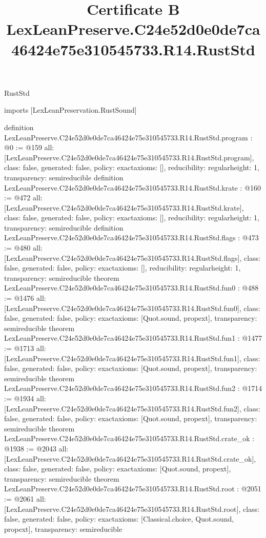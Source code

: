 \begin{lexlean}{RustStd}
\title{Certificate B LexLeanPreserve.C24e52d0e0de7ca46424e75e310545733.R14.RustStd}
\begin{coremodule}
imports [LexLeanPreservation.RustSound]

definition LexLeanPreserve.C24e52d0e0de7ca46424e75e310545733.R14.RustStd.program : @0 := @159 {
  all: [LexLeanPreserve.C24e52d0e0de7ca46424e75e310545733.R14.RustStd.program],
  class: false,
  generated: false,
  policy: exact{axioms: []},
  reducibility: regular{height: 1},
  transparency: semireducible
}
definition LexLeanPreserve.C24e52d0e0de7ca46424e75e310545733.R14.RustStd.krate : @160 := @472 {
  all: [LexLeanPreserve.C24e52d0e0de7ca46424e75e310545733.R14.RustStd.krate],
  class: false,
  generated: false,
  policy: exact{axioms: []},
  reducibility: regular{height: 1},
  transparency: semireducible
}
definition LexLeanPreserve.C24e52d0e0de7ca46424e75e310545733.R14.RustStd.flags : @473 := @480 {
  all: [LexLeanPreserve.C24e52d0e0de7ca46424e75e310545733.R14.RustStd.flags],
  class: false,
  generated: false,
  policy: exact{axioms: []},
  reducibility: regular{height: 1},
  transparency: semireducible
}
theorem LexLeanPreserve.C24e52d0e0de7ca46424e75e310545733.R14.RustStd.fun0 : @488 := @1476 {
  all: [LexLeanPreserve.C24e52d0e0de7ca46424e75e310545733.R14.RustStd.fun0],
  class: false,
  generated: false,
  policy: exact{axioms: [Quot.sound, propext]},
  transparency: semireducible
}
theorem LexLeanPreserve.C24e52d0e0de7ca46424e75e310545733.R14.RustStd.fun1 : @1477 := @1713 {
  all: [LexLeanPreserve.C24e52d0e0de7ca46424e75e310545733.R14.RustStd.fun1],
  class: false,
  generated: false,
  policy: exact{axioms: [Quot.sound, propext]},
  transparency: semireducible
}
theorem LexLeanPreserve.C24e52d0e0de7ca46424e75e310545733.R14.RustStd.fun2 : @1714 := @1934 {
  all: [LexLeanPreserve.C24e52d0e0de7ca46424e75e310545733.R14.RustStd.fun2],
  class: false,
  generated: false,
  policy: exact{axioms: [Quot.sound, propext]},
  transparency: semireducible
}
theorem LexLeanPreserve.C24e52d0e0de7ca46424e75e310545733.R14.RustStd.crate_ok : @1938 := @2043 {
  all: [LexLeanPreserve.C24e52d0e0de7ca46424e75e310545733.R14.RustStd.crate_ok],
  class: false,
  generated: false,
  policy: exact{axioms: [Quot.sound, propext]},
  transparency: semireducible
}
theorem LexLeanPreserve.C24e52d0e0de7ca46424e75e310545733.R14.RustStd.root : @2051 := @2061 {
  all: [LexLeanPreserve.C24e52d0e0de7ca46424e75e310545733.R14.RustStd.root],
  class: false,
  generated: false,
  policy: exact{axioms: [Classical.choice, Quot.sound, propext]},
  transparency: semireducible
}


\end{coremodule}
\end{lexlean}
